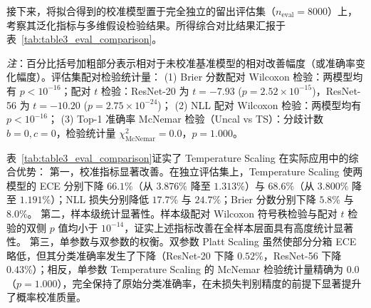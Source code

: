 接下来，将拟合得到的校准模型置于完全独立的留出评估集（$n_{\mathrm{eval}} = 8000$）上，考察其泛化指标与多维假设检验结果。所得综合对比结果汇报于表~\ref{tab:table3_eval_comparison}。

\begin{table}[htbp]
\centering\small
\caption{独立评估集（$n_{\mathrm{eval}}=8000$）多维校准指标综合对比与评估集假设检验结果}\label{tab:table3_eval_comparison}
\begin{minipage}{0.95\textwidth}\footnotesize
\vspace{0.4em}
\textit{注}：百分比括号加粗部分表示相对于未校准基准模型的相对改善幅度（或准确率变化幅度）。评估集配对检验统计量：
(1) Brier 分数配对 Wilcoxon 检验：两模型均有 $p < 10^{-16}$；配对 $t$ 检验：ResNet-20 为 $t = -7.93$ ($p = 2.52 \times 10^{-15}$)，ResNet-56 为 $t = -10.20$ ($p = 2.75 \times 10^{-24}$)；
(2) NLL 配对 Wilcoxon 检验：两模型均有 $p < 10^{-16}$；
(3) Top-1 准确率 McNemar 检验（Uncal vs TS）：分歧计数 $b = 0, c = 0$，检验统计量 $\chi^2_{\mathrm{McNemar}} = 0.0$，$p = 1.000$。
\end{minipage}
\end{table}

表~\ref{tab:table3_eval_comparison}证实了 Temperature Scaling 在实际应用中的综合优势：
第一，校准指标显著改善。在独立评估集上，Temperature Scaling 使两模型的 ECE 分别下降 $66.1\%$（从 $3.876\%$ 降至 $1.313\%$）与 $68.6\%$（从 $3.800\%$ 降至 $1.191\%$）；NLL 损失分别降低 $17.7\%$ 与 $24.7\%$；Brier 分数分别下降 $5.8\%$ 与 $8.0\%$。
第二，样本级统计显著性。样本级配对 Wilcoxon 符号秩检验与配对 $t$ 检验的双侧 $p$ 值均小于 $10^{-14}$，证实上述指标改善在全样本层面具有高度统计显著性。
第三，单参数与双参数的权衡。双参数 Platt Scaling 虽然使部分分箱 ECE 略低，但其分类准确率发生了下降（ResNet-20 下降 $0.52\%$，ResNet-56 下降 $0.43\%$）；相反，单参数 Temperature Scaling 的 McNemar 检验统计量精确为 0.0（$p = 1.000$），完全保持了原始分类准确率，在未损失判别精度的前提下显著提升了概率校准质量。


